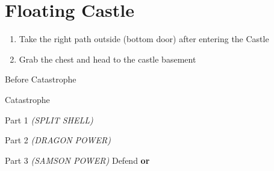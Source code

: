 \chapter{Floating Castle}

\vspace{\baselineskip}

\begin{paracol}{2}

\begin{enumerate}
    \item Take the right path outside (bottom door) after entering the Castle
    \item Grab the  chest and head to the castle basement
\end{enumerate}

\begin{menu}{Before Catastrophe}
    \varwb
    \begin{equipMenu}
        \faris \optimize
    \end{equipMenu}
    \varwe
\end{menu}

\begin{boss}{Catastrophe}
    \varwb
    \begin{bossPart}{Part 1}
        \bartz[\bossHl{(1x)}] \rightCommand{\combine} \then \battleGroup{\antidote \space + \turtleShell} \textit{(SPLIT SHELL)} \then {}
        \faris[\bossHl{(1x)}] \leftCommand{\drink} \then \heroDrink
    \end{bossPart}
    \begin{bossPart}{Part 2}
        \cara[\bossHl{(1x)}] \rightCommand{\gilToss}
        \bartz[\bossHl{(1x)}] \rightCommand{\combine} \then \battleGroup{\potion \space + \dragonFang} \textit{(DRAGON POWER)} \then {}
        \lenna[\bossHl{(1x)}] \rightCommand{\dimenAbility} \then \float \space \then {}
    \end{bossPart}
    \begin{bossPart}{Part 3}
        \faris[\bossHl{(3x)}] \rightCommand{\gilToss}
        \bartz[\bossHl{(2x)}] \rightCommand{\combine} \then \battleGroup{\revivify \space + \antidote} \textit{(SAMSON POWER)} \then {}
        \cara[\bossHl{(1x)}] \rightCommand{\gilToss}
        \lenna[\bossHl{(1x)}] Defend \textbf{or} \rightCommand{\dimenAbility} \then \float \space \then {}
    \end{bossPart}
    \varwe
\end{boss}


\end{paracol}
